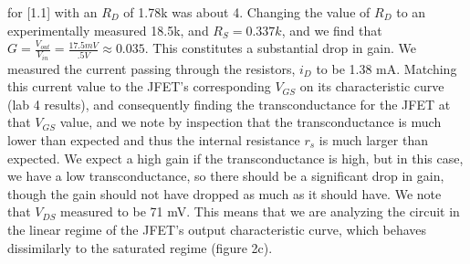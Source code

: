 \documentclass{article}
\begin{document}
    for [1.1] with an $R_D$ of 1.78k was about 4. Changing the value of $R_D$ to an experimentally measured 18.5k, and $R_S = 0.337k$, and we find that $G = \frac{V_{out}}{V_{in}} = \frac{17.5 mV}{.5 V} \approx 0.035$. This constitutes a substantial drop in gain. We measured the current passing through the resistors, $i_D$ to be 1.38 mA. Matching this current value to the JFET's corresponding $V_{GS}$ on its characteristic curve (lab 4 results), and consequently finding the transconductance for the JFET at that $V_{GS}$ value, and we note by inspection that the transconductance is much lower than expected and thus the internal resistance $r_s$ is much larger than expected. We expect a high gain if the transconductance is high, but in this case, we have a low transconductance, so there should be a significant drop in gain, though the gain should not have dropped as much as it should have. We note that $V_{DS}$ measured to be 71 mV. This means that we are analyzing the circuit in the linear regime of the JFET's output characteristic curve, which behaves dissimilarly to the saturated regime (figure 2c).
\end{document}
